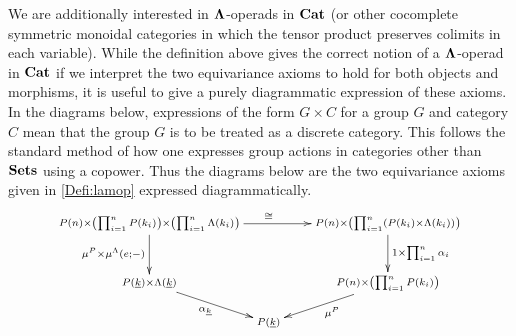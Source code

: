 We are additionally interested in $\mathbf{\Lambda}$-operads in $\mathbf{Cat}$ (or other cocomplete symmetric monoidal categories in which the tensor product preserves colimits in each variable). While the definition above gives the correct notion of a $\mathbf{\Lambda}$-operad in $\mathbf{Cat}$ if we interpret the two equivariance axioms to hold for both objects and morphisms, it is useful to give a purely diagrammatic expression of these axioms. In the diagrams below, expressions of the form $G \times C$ for a group $G$ and category $C$ mean that the group $G$ is to be treated as a discrete category. This follows the standard method of how one expresses group actions in categories other than $\mathbf{Sets}$ using a copower. Thus the diagrams below are the two equivariance axioms given in \cref{Defi:lamop} expressed diagrammatically.
  \[
    \xy
      (0,0)*+{\scriptstyle P(n) \times \left(\prod_{i=1}^n P(k_i)\right) \times \left(\prod_{i=1}^n \Lambda(k_i)\right)} ="00";
      (0,-15)*+{\scriptstyle P(\underline{k}) \times \Lambda(\underline{k}) } ="01";
      (60,0)*+{\scriptstyle P(n) \times \left(\prod_{i=1}^n \left(P(k_{i}) \times \Lambda(k_{i})\right)\right)} ="20";
      (60,-15)*+{\scriptstyle P(n) \times \left(\prod_{i=1}^n P(k_i)\right) } ="21";
      (30, -25)*+{\scriptstyle P(\underline{k}) } ="12";%
      {\ar^{\cong} "00" ; "20"};
      {\ar^{1 \times \prod_{i=1}^n \alpha_i} "20" ; "21"};
      {\ar^{\mu^P} "21" ; "12"};
      {\ar_{\mu^P \times \mu^\Lambda(e;-)} "00" ; "01"};
      {\ar_{\alpha_{\underline{k}}} "01" ; "12"};
    \endxy
  \]
